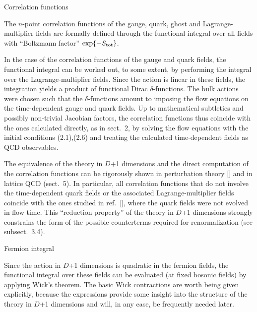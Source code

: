 Correlation functions

The $n$-point correlation functions of the 
gauge, quark, ghost and Lagrange-multiplier fields 
are formally defined through the functional integral
over all fields with ``Boltzmann factor'' 
$\exp\{-S_{\rm tot}\}$. 

In the case of the correlation functions of the gauge and quark fields,
the functional integral can be worked out, to some
extent, by performing the integral over the Lagrange-multiplier
fields. Since the action is linear in these fields,
the integration yields 
a product of functional Dirac $\delta$-functions.
The bulk actions were chosen such that
the $\delta$-functions amount to imposing the flow equations on 
the time-dependent gauge and quark fields. 
Up to mathematical subtleties and possibly non-trivial Jacobian factors,
the correlation functions thus coincide with the ones
calculated directly, as in sect.~2, by
solving the flow equations with the initial
conditions (2.1),(2.6) and treating the calculated
time-dependent fields as QCD observables.

The equivalence of the theory in $D$+1 dimensions and the 
direct computation of the correlation functions
can be rigorously shown in perturbation theory
[\cite{RenFlow}] and in lattice QCD (sect.~5).
In particular, all correlation functions 
that do not involve the time-dependent quark fields or
the associated Lagrange-multiplier fields
coincide with the ones studied in ref.~[\cite{RenFlow}],
where the quark fields were not evolved in flow time.
This ``reduction property'' 
of the theory in $D$+1 dimensions strongly constrains
the form of the possible counterterms
required for renormalization (see subsect.~3.4).


 Fermion integral

Since the action in $D$+1 dimensions 
is quadratic in the fermion fields,
the functional integral over these fields can be
evaluated (at fixed bosonic fields) by applying Wick's theorem.
The basic Wick contractions are worth being given explicitly, 
because the expressions provide some insight
into the structure of the theory
in $D$+1 dimensions and will, in any case, be
frequently needed later.

